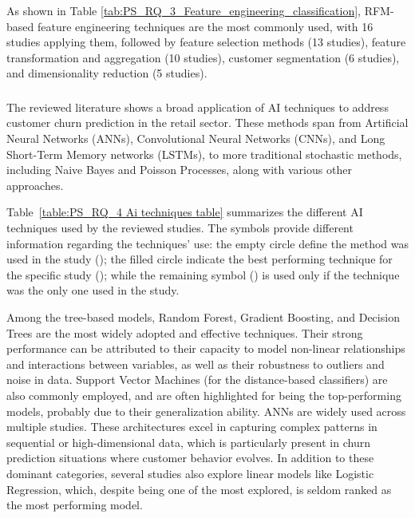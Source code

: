 As shown in Table \ref{tab:PS_RQ_3_Feature_engineering_classification}, RFM-based feature engineering techniques are the most commonly used, with 16 studies applying them, followed by feature selection methods (13 studies), feature transformation and aggregation (10 studies), customer segmentation (6 studies), and dimensionality reduction  (5 studies).

\subsubsection{\RSRQfour}
\label{sec:RQ4}
The reviewed literature shows a broad application of AI techniques to address customer churn prediction in the retail sector. These methods span from Artificial Neural Networks (ANNs), Convolutional Neural Networks (CNNs), and Long Short-Term Memory networks (LSTMs), to more traditional stochastic methods, including Naive Bayes and Poisson Processes, along with various other approaches.

Table~\ref{table:PS_RQ_4 Ai techniques table} summarizes the different AI techniques used by the reviewed studies. The symbols provide different information regarding the techniques' use: the empty circle define the method was used in the study (\scalebox{0.9}{\textopenbullet}); the filled circle indicate the best performing technique for the specific study (\scalebox{0.9}{\textbullet}); while the remaining symbol (\scalebox{0.6}{$\blacksquare$}) is used only if the technique was the only one used in the study.

Among the tree-based models, Random Forest, Gradient Boosting, and Decision Trees are the most widely adopted and effective techniques. Their strong performance can be attributed to their capacity to model non-linear relationships and interactions between variables, as well as their robustness to outliers and noise in data. Support Vector Machines (for the distance-based classifiers) are also commonly employed, and are often highlighted for being the top-performing models, probably due to their generalization ability. ANNs are widely used across multiple studies. These architectures excel in capturing complex patterns in sequential or high-dimensional data, which is particularly present in churn prediction situations where customer behavior evolves. In addition to these dominant categories, several studies also explore linear models like Logistic Regression, which, despite being one of the most explored, is seldom ranked as the most performing model.


